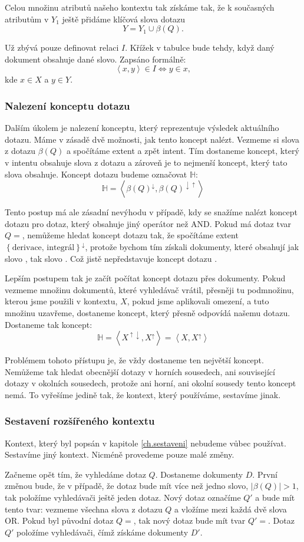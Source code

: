 \documentclass[12pt]{article}
\newcommand{\sssection}[1]{\subsubsection{#1}}
\newcommand{\adds}[1]{\left\{#1\right\}}
\newcommand{\addsp}[1]{\left<#1\right>}
\newcommand{\up}{^{\uparrow}}
\newcommand{\down}{^{\downarrow}}
\newcommand{\updown}{^{\uparrow\downarrow}}
\newcommand{\downup}{^{\downarrow\uparrow}}
\newcommand{\hledany}{\mathbb{H}}
\begin{document}
Celou množinu atributů našeho kontextu tak získáme tak, že k současných atributům v $Y_1$ ještě přidáme klíčová slova dotazu
$$
Y=Y_1\cup\beta(Q).
$$

Už zbývá pouze definovat relaci $I$. Křížek v tabulce bude tehdy, když daný dokument obsahuje dané slovo. Zapsáno formálně:
$$
\addsp{x,y} \in I \iff y \in x,
$$
kde $x \in X$ a $y \in Y$.

\sssection{Nalezení konceptu dotazu}
Dalším úkolem je nalezení konceptu, který reprezentuje výsledek aktuálního dotazu. Máme v zásadě dvě možnosti, jak tento koncept nalézt. Vezmeme si slova z dotazu $\beta(Q)$ a spočítáme extent a zpět intent. Tím dostaneme koncept, který v intentu obsahuje slova z dotazu a zároveň je to nejmenší koncept, který tato slova obsahuje. Koncept dotazu budeme označovat $\hledany$:
$$
\hledany=\addsp{\beta(Q)\down, \beta(Q)\downup}
$$

Tento postup má ale zásadní nevýhodu v případě, kdy se snažíme nalézt koncept dotazu pro dotaz, který obsahuje jiný operátor než AND. Pokud má dotaz tvar $Q=$, nemůžeme hledat koncept dotazu tak, že spočítáme extent $\adds{\mbox{derivace, integrál}}\down$, protože bychom tím získali dokumenty, které obsahují jak slovo , tak slovo . Což jistě nepředstavuje koncept dotazu .

Lepším postupem tak je začít počítat koncept dotazu přes dokumenty. Pokud vezmeme množinu dokumentů, které vyhledávač vrátil, přesněji tu podmnožinu, kterou jsme použili v kontextu, $X$, pokud jsme aplikovali omezení, a tuto množinu uzavřeme, dostaneme koncept, který přesně odpovídá našemu dotazu. Dostaneme tak koncept:
$$
\hledany=\addsp{X\updown, X\up}=\addsp{X, X\up}
$$

Problémem tohoto přístupu je, že vždy dostaneme ten největší koncept. Nemůžeme tak hledat obecnější dotazy v horních sousedech, ani související dotazy v okolních sousedech, protože ani horní, ani okolní sousedy tento koncept nemá. To vyřešíme jedině tak, že kontext, který používáme, sestavíme jinak. 


\sssection{Sestavení rozšířeného kontextu}
Kontext, který byl popsán v kapitole \ref{ch.sestaveni} nebudeme vůbec používat. Sestavíme jiný kontext. Nicméně provedeme pouze malé změny. 

Začneme opět tím, že vyhledáme dotaz $Q$. Dostaneme dokumenty $D$. První změnou bude, že v případě, že dotaz bude mít více než jedno slovo, $|\beta(Q)|>1$, tak položíme vyhledávači ještě jeden dotaz. Nový dotaz označíme $Q'$ a bude mít tento tvar: vezmeme všechna slova z dotazu $Q$ a vložíme mezi každá dvě slova OR. Pokud byl původní dotaz $Q=$, tak nový dotaz bude mít tvar $Q'=$. Dotaz $Q'$ položíme vyhledávači, čímž získáme dokumenty $D'$.
\end{document}
